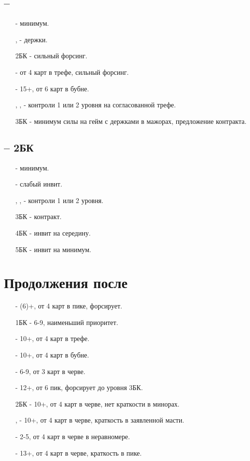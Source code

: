 \documentclass{article}
\begin{document}
\subsection{ -- }
\begin{enumerate}
    \item[\di{2}] - минимум.
    \item[\he{2}, \sp{2}] - держки.
    \item[2БК] - сильный форсинг.
    \item[\cl{3}] - от 4 карт в трефе, сильный форсинг.
    \item[\di{3}] - 15+, от 6 карт в бубне.
    \item[\he{3}, \sp{3}, \di{4}] - контроли 1 или 2 уровня на согласованной трефе.
    \item[3БК] - минимум силы на гейм с держками в мажорах, предложение контракта.
\end{enumerate}
\subsection{ -- 2БК}
\begin{enumerate}
    \item[\cl{3}] - минимум.
    \item[\di{3}] - слабый инвит.
    \item[\he{3}, \sp{3}, \cl{4}] - контроли 1 или 2 уровня.
    \item[3БК] - контракт.
    \item[4БК] - инвит на середину.
    \item[5БК] - инвит на минимум.
\end{enumerate}
\section{Продолжения после }
\begin{enumerate}
    \item[\sp{1}] - (6)+, от 4 карт в пике, форсирует.
    \item[1БК] - 6-9, наименьший приоритет.
    \item[\cl{2}] - 10+, от 4 карт в трефе.
    \item[\di{2}] - 10+, от 4 карт в бубне.
    \item[\he{2}] - 6-9, от 3 карт в черве.
    \item[\sp{2}] - 12+, от 6 пик, форсирует до уровня 3БК.
    \item[2БК] - 10+, от 4 карт в черве, нет краткости в минорах.
    \item[\cl{3}, \di{3}] - 10+, от 4 карт в черве, краткость в заявленной масти.
    \item[\he{3}] - 2-5, от 4 карт в черве в неравномере.
    \item[\sp{3}] - 13+, от 4 карт в черве, краткость в пике.
\end{enumerate}
\end{document}
